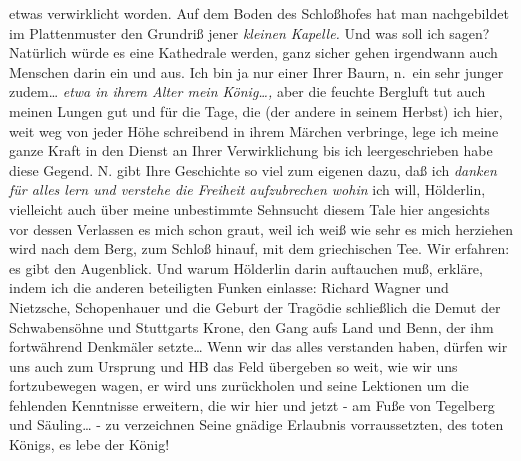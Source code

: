 \documentclass[
]{article}
\begin{document}
etwas verwirklicht worden. Auf dem Boden des Schloßhofes hat man
nachgebildet im Plattenmuster den Grundriß jener \emph{kleinen Kapelle.}
Und was soll ich sagen? Natürlich würde es eine Kathedrale werden, ganz
sicher gehen irgendwann auch Menschen darin ein und aus. Ich bin ja nur
einer Ihrer Baurn, n.~ein sehr junger zudem\ldots{} \emph{etwa in ihrem
Alter mein König\ldots,} aber die feuchte Bergluft tut auch meinen
Lungen gut und für die Tage, die (der andere in seinem Herbst) ich hier,
weit weg von jeder Höhe schreibend in ihrem Märchen verbringe, lege ich
meine ganze Kraft in den Dienst an Ihrer Verwirklichung bis ich
leergeschrieben habe diese Gegend. N. gibt Ihre Geschichte so viel zum
eigenen dazu, daß ich \emph{danken für alles lern und verstehe die
Freiheit aufzubrechen wohin }ich will, Hölderlin, vielleicht auch über
meine unbestimmte Sehnsucht diesem Tale hier angesichts vor dessen
Verlassen es mich schon graut, weil ich weiß wie sehr es mich herziehen
wird nach dem Berg, zum Schloß hinauf, mit dem griechischen Tee. Wir
erfahren: es gibt den Augenblick. Und warum Hölderlin darin auftauchen
muß, erkläre, indem ich die anderen beteiligten Funken einlasse: Richard
Wagner und Nietzsche, Schopenhauer und die Geburt der Tragödie
schließlich die Demut der Schwabensöhne und Stuttgarts Krone, den Gang
aufs Land und Benn, der ihm fortwährend Denkmäler setzte\ldots{} Wenn
wir das alles verstanden haben, dürfen wir uns auch zum Ursprung und HB
das Feld übergeben so weit, wie wir uns fortzubewegen wagen, er wird uns
zurückholen und seine Lektionen um die fehlenden Kenntnisse erweitern,
die wir hier und jetzt - am Fuße von Tegelberg und Säuling\ldots{} - zu
verzeichnen Seine gnädige Erlaubnis vorraussetzten, des toten Königs, es
lebe der König!
\end{document}
